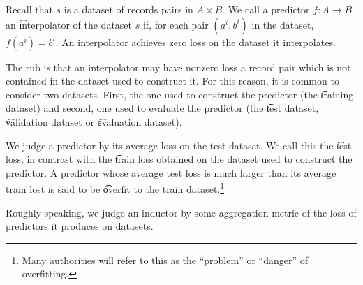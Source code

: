 Recall that $s$ is a dataset of records pairs in $A \times B$.
We call a predictor $f: A \to B$ an \t{interpolator} of the dataset $s$ if, for each pair $(a^i, b^i)$ in the dataset, $f(a^i) = b^i$.
An interpolator achieves zero loss on the dataset it interpolates.

The rub is that an interpolator may have nonzero loss a record pair which is not contained in the dataset used to construct it.
For this reason, it is common to consider two datasets.
First, the one used to construct the predictor (the \t{training dataset}) and second, one used to evaluate the predictor (the \t{test dataset}, \t{validation dataset} or \t{evaluation dataset}).

We judge a predictor by its average loss on the test dataset.
We call this the \t{test loss}, in contrast with the \t{train loss} obtained on the dataset used to construct the predictor.
A predictor whose average test loss is much larger than its average train lost is said to be \t{overfit} to the train dataset.\footnote{Many authorities will refer to this as the ``problem'' or ``danger'' of overfitting.}

Roughly speaking, we judge an inductor by some aggregation metric of the loss of predictors it produces on datasets.

